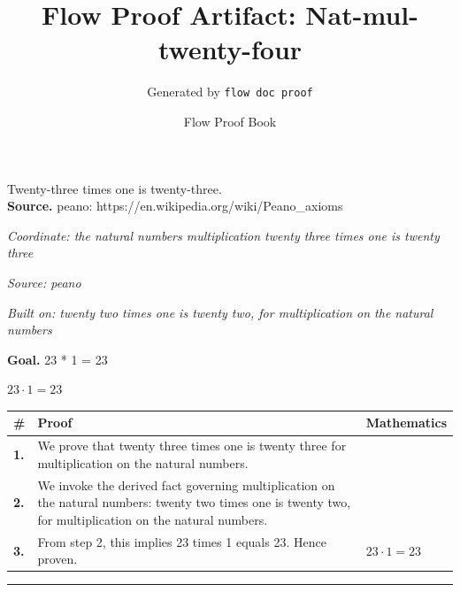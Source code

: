 \documentclass[11pt]{article}
\title{Flow Proof Artifact: Nat-mul-twenty-four}
\author{Generated by \texttt{flow doc proof}}
\date{Flow Proof Book}
\theoremstyle{definition}
\begin{document}
\maketitle
Twenty-three times one is twenty-three.\\[0.5em]
\textbf{Source.} peano: https://en.wikipedia.org/wiki/Peano\_axioms\\[0.5em]
\bigskip
{}\par
\smallskip\noindent\textit{Coordinate: the natural numbers \cdot multiplication \cdot twenty three times one is twenty three}\par
\smallskip\noindent\textit{Source: peano}\par
\smallskip\noindent\textit{Built on: twenty two times one is twenty two, for multiplication on the natural numbers}\par
\medskip
\noindent\textbf{Goal.} 23 * 1 = 23\par
\noindent$\displaystyle 23 \cdot 1 = 23$\par
\medskip
\noindent
\begin{tabular}{@{} >{\raggedright\arraybackslash}p{} >{\raggedright\arraybackslash}p{} >{\raggedleft\arraybackslash}p{} @{}}
\textbf{\#} & \textbf{Proof} & \textbf{Mathematics} \\
\midrule
\textbf{1.} & We prove that twenty three times one is twenty three for multiplication on the natural numbers. & \\[0.45em]
\textbf{2.} & We invoke the derived fact governing multiplication on the natural numbers: twenty two times one is twenty two, for multiplication on the natural numbers. & \\[0.45em]
\textbf{3.} & From step 2, this implies 23 times 1 equals 23. Hence proven. & $\displaystyle 23 \cdot 1 = 23$ \\[0.45em]
\bottomrule
\end{tabular}
\label{thm:Nat-multiplication-twenty_three_times_one_is_twenty_three}
\par\medskip\hrule
\end{document}
